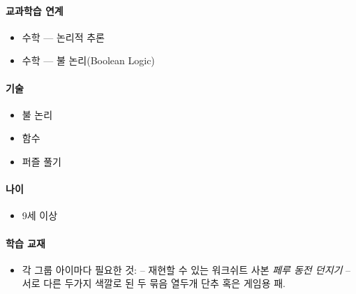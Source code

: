 \documentclass[]{article}
\begin{document}
\mbox{}\paragraph{교과학습 연계}\label{section-236}

\begin{itemize}
\itemsep1pt\parskip0pt
\item
  수학 --- 논리적 추론
\item
  수학 --- 불 논리(Boolean Logic)
\end{itemize}

\mbox{}\paragraph{기술}\label{section-237}

\begin{itemize}
\itemsep1pt\parskip0pt
\item
  불 논리
\item
  함수
\item
  퍼즐 풀기
\end{itemize}

\mbox{}\paragraph{나이}\label{section-238}

\begin{itemize}
\itemsep1pt\parskip0pt
\item
  9세 이상
\end{itemize}

\mbox{}\paragraph{학습 교재}\label{section-239}

\begin{itemize}
\itemsep1pt\parskip0pt
\item
  각 그룹 아이마다 필요한 것: -- 재현할 수 있는 워크쉬트 사본 \emph{페루
  동전 던지기} -- 서로 다른 두가지 색깔로 된 두 묶음 열두개 단추 혹은
  게임용 패.
\end{itemize}

\end{document}
